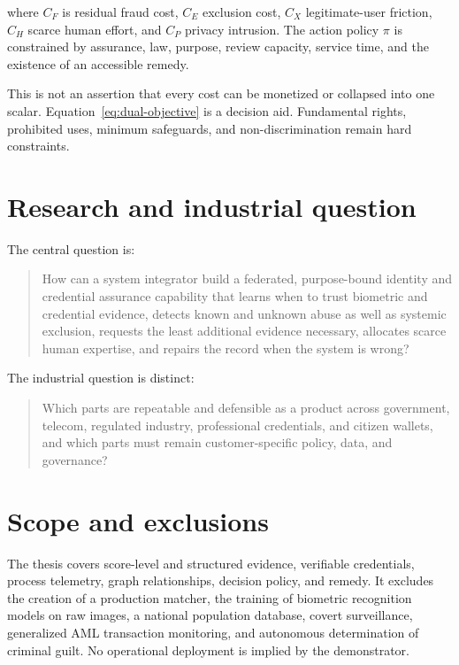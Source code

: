 where $C_F$ is residual fraud cost, $C_E$ exclusion cost, $C_X$ legitimate-user friction, $C_H$ scarce human effort, and $C_P$ privacy intrusion. The action policy $\pi$ is constrained by assurance, law, purpose, review capacity, service time, and the existence of an accessible remedy.

This is not an assertion that every cost can be monetized or collapsed into one scalar. Equation~\ref{eq:dual-objective} is a decision aid. Fundamental rights, prohibited uses, minimum safeguards, and non-discrimination remain hard constraints.

\section{Research and industrial question}

The central question is:

\begin{quote}
How can a system integrator build a federated, purpose-bound identity and credential assurance capability that learns when to trust biometric and credential evidence, detects known and unknown abuse as well as systemic exclusion, requests the least additional evidence necessary, allocates scarce human expertise, and repairs the record when the system is wrong?
\end{quote}

The industrial question is distinct:

\begin{quote}
Which parts are repeatable and defensible as a product across government, telecom, regulated industry, professional credentials, and citizen wallets, and which parts must remain customer-specific policy, data, and governance?
\end{quote}

\section{Scope and exclusions}

The thesis covers score-level and structured evidence, verifiable credentials, process telemetry, graph relationships, decision policy, and remedy. It excludes the creation of a production matcher, the training of biometric recognition models on raw images, a national population database, covert surveillance, generalized AML transaction monitoring, and autonomous determination of criminal guilt. No operational deployment is implied by the demonstrator.
